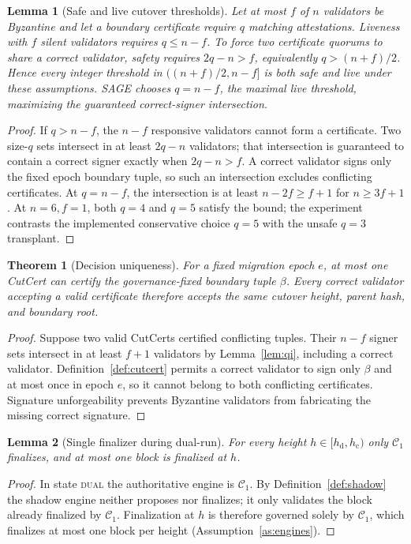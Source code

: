 \documentclass[journal]{IEEEtran}
\newtheorem{theorem}{Theorem}
\newtheorem{lemma}{Lemma}
\theoremstyle{definition}
\theoremstyle{remark}
\begin{document}
\begin{lemma}[Safe and live cutover thresholds]
\label{lem:necessity}
Let at most $f$ of $n$ validators be Byzantine and let a boundary certificate require $q$ matching
attestations. Liveness with $f$ silent validators requires $q\le n-f$. To force two certificate
quorums to share a correct validator, safety requires $2q-n>f$, equivalently
$q>(n+f)/2$. Hence every integer threshold in $((n+f)/2,n-f]$ is both safe and live under these
assumptions. SAGE chooses $q=n-f$, the maximal live threshold, maximizing the guaranteed
correct-signer intersection.
\end{lemma}
\begin{proof}
If $q>n-f$, the $n-f$ responsive validators cannot form a certificate. Two size-$q$ sets intersect
in at least $2q-n$ validators; that intersection is guaranteed to contain a correct signer exactly
when $2q-n>f$. A correct validator signs only the fixed epoch boundary tuple, so such an
intersection excludes conflicting certificates. At $q=n-f$, the intersection is at least
$n-2f\ge f+1$ for $n\ge3f+1$. At $n=6,f=1$, both $q=4$ and $q=5$ satisfy the bound; the experiment
contrasts the implemented conservative choice $q=5$ with the unsafe $q=3$ transplant.
\end{proof}

\begin{theorem}[Decision uniqueness]
\label{th:unique}
For a fixed migration epoch $e$, at most one CutCert can certify the governance-fixed boundary
tuple $\beta$. Every correct validator accepting a valid certificate therefore accepts the same
cutover height, parent hash, and boundary root.
\end{theorem}
\begin{proof}
Suppose two valid CutCerts certified conflicting tuples. Their $n-f$ signer sets intersect in at
least $f+1$ validators by Lemma~\ref{lem:qi}, including a correct validator. Definition~\ref{def:cutcert}
permits a correct validator to sign only $\beta$ and at most once in epoch $e$, so it cannot belong
to both conflicting certificates. Signature unforgeability prevents Byzantine validators from
fabricating the missing correct signature.
\end{proof}

\begin{lemma}[Single finalizer during dual-run]
\label{lem:single}
For every height $h\in[h_{\mathrm{d}},h_{\mathrm{c}})$ only $\mathcal{C}_1$ finalizes, and at
most one block is finalized at $h$.
\end{lemma}
\begin{proof}
In state \textsc{dual} the authoritative engine is $\mathcal{C}_1$. By
Definition~\ref{def:shadow} the shadow engine neither proposes nor finalizes; it only validates
the block already finalized by $\mathcal{C}_1$. Finalization at $h$ is therefore governed solely
by $\mathcal{C}_1$, which finalizes at most one block per height (Assumption~\ref{as:engines}).
\end{proof}
\end{document}

